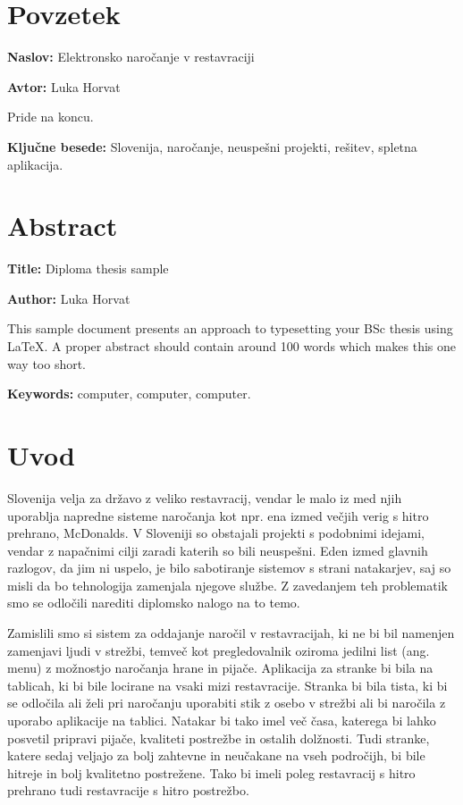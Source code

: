 \documentclass[a4paper, 12pt]{book}
\newcommand{\ttitle}{Elektronsko naročanje v restavraciji}
\newcommand{\ttitleEn}{Diploma thesis sample}
\newcommand{\tauthor}{Luka Horvat}
\newcommand{\tkeywords}{Slovenija, naročanje, neuspešni projekti, rešitev, spletna aplikacija}
\newcommand{\tkeywordsEn}{computer, computer, computer}
\newcommand{\clearemptydoublepage}{\newpage{\pagestyle{empty}\cleardoublepage}}
\begin{document}
\clearemptydoublepage

\chapter*{Povzetek}

\noindent\textbf{Naslov:} \ttitle
\bigskip

\noindent\textbf{Avtor:} \tauthor
\bigskip

\noindent 
Pride na koncu.

\noindent\textbf{Ključne besede:} \tkeywords.
\clearemptydoublepage

\chapter*{Abstract}

\noindent\textbf{Title:} \ttitleEn
\bigskip

\noindent\textbf{Author:} \tauthor
\bigskip

\noindent This sample document presents an approach to typesetting your BSc thesis using \LaTeX. 
A proper abstract should contain around 100 words which makes this one way too short.
\bigskip

\noindent\textbf{Keywords:} \tkeywordsEn.
\clearemptydoublepage

\mainmatter
\setcounter{page}{1}
\pagestyle{fancy}

\chapter{Uvod}
Slovenija velja za državo z veliko restavracij, vendar le malo iz med njih uporablja napredne sisteme naročanja kot npr. ena izmed večjih verig s hitro prehrano, McDonalds. V Sloveniji so obstajali projekti s podobnimi idejami, vendar z napačnimi cilji zaradi katerih so bili neuspešni. Eden izmed glavnih razlogov, da jim ni uspelo, je bilo sabotiranje sistemov s strani natakarjev, saj so misli da bo tehnologija zamenjala njegove službe. Z zavedanjem teh problematik smo se odločili narediti diplomsko nalogo na to temo. 

Zamislili smo si sistem za oddajanje naročil v restavracijah, ki ne bi bil namenjen zamenjavi ljudi v strežbi, temveč kot pregledovalnik oziroma jedilni list (ang. menu) z možnostjo naročanja hrane in pijače. Aplikacija za stranke bi bila na tablicah, ki bi bile locirane na vsaki mizi restavracije. Stranka bi bila tista, ki bi se odločila ali želi pri naročanju uporabiti stik z osebo v strežbi ali bi naročila z uporabo aplikacije na tablici. Natakar bi tako imel več časa, katerega bi lahko posvetil pripravi pijače, kvaliteti postrežbe in ostalih dolžnosti. Tudi stranke, katere sedaj veljajo za bolj zahtevne in neučakane na vseh področijh, bi bile hitreje in bolj kvalitetno postrežene. Tako bi imeli poleg restavracij s hitro prehrano tudi restavracije s hitro postrežbo. 
\end{document}
